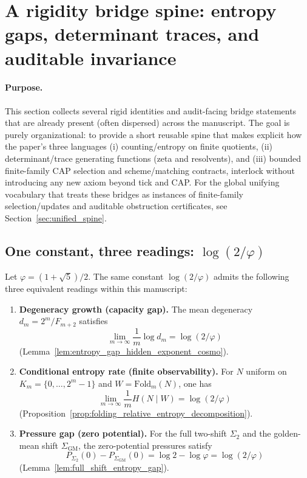 \section{A rigidity bridge spine: entropy gaps, determinant traces, and auditable invariance}
\label{sec:rigidity_bridge_spine}

\paragraph{Purpose.}
\AuditTag This section collects several rigid identities and audit-facing bridge statements that are already present (often dispersed) across the manuscript.
The goal is purely organizational: to provide a short reusable spine that makes explicit how the paper's three languages
(i) counting/entropy on finite quotients,
(ii) determinant/trace generating functions (zeta and resolvents),
and (iii) bounded finite-family CAP selection and scheme/matching contracts,
interlock without introducing any new axiom beyond tick and CAP.
\AuditTag For the global unifying vocabulary that treats these bridges as instances of finite-family selection/updates and auditable obstruction certificates, see Section~\ref{sec:unified_spine}.

\subsection{One constant, three readings: \texorpdfstring{$\log(2/\varphi)$}{log(2/phi)}}
\label{subsec:rigidity_log2phi_triple_reading}

\begin{proposition}\label{prop:rigidity_log2phi_triple_reading}
\MathTag Let $\varphi=(1+\sqrt{5})/2$.
The same constant $\log(2/\varphi)$ admits the following three equivalent readings within this manuscript:
\begin{enumerate}
\item \textbf{Degeneracy growth (capacity gap).}
The mean degeneracy $d_m=2^m/F_{m+2}$ satisfies
\[
\lim_{m\to\infty}\frac{1}{m}\log d_m=\log(2/\varphi)
\]
(Lemma~\ref{lem:entropy_gap_hidden_exponent_cosmo}).
\item \textbf{Conditional entropy rate (finite observability).}
For $N$ uniform on $K_m=\{0,\dots,2^m-1\}$ and $W=\mathrm{Fold}_m(N)$, one has
\[
\lim_{m\to\infty}\frac{1}{m}H(N\mid W)=\log(2/\varphi)
\]
(Proposition~\ref{prop:folding_relative_entropy_decomposition}).
\item \textbf{Pressure gap (zero potential).}
For the full two-shift $\Sigma_2$ and the golden-mean shift $\Sigma_{\mathrm{GM}}$, the zero-potential pressures satisfy
\[
P_{\Sigma_2}(0)-P_{\Sigma_{\mathrm{GM}}}(0)=\log 2-\log\varphi=\log(2/\varphi)
\]
(Lemma~\ref{lem:full_shift_entropy_gap}).
\end{enumerate}
\end{proposition}

